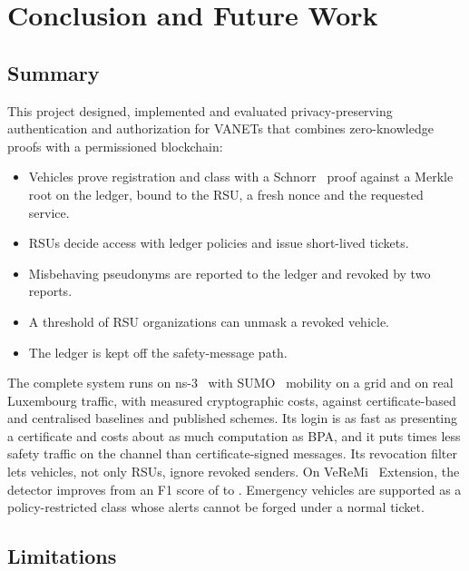 \chapter{Conclusion and Future Work}\label{ch:conclusion}

\section{Summary}

This project designed, implemented and evaluated privacy-preserving authentication and authorization
for VANETs that combines zero-knowledge proofs with a permissioned blockchain:
\begin{itemize}
  \item Vehicles prove registration and class with a Schnorr~\cite{schnorr1991} proof against a Merkle~\cite{merkle1987} root on the
  ledger, bound to the RSU, a fresh nonce and the requested service.
  \item RSUs decide access with ledger policies and issue short-lived tickets.
  \item Misbehaving pseudonyms are reported to the ledger and revoked by two reports.
  \item A threshold of RSU organizations can unmask a revoked vehicle.
  \item The ledger is kept off the safety-message path.
\end{itemize}
The complete system runs on ns-3~\cite{riley2010ns3} with SUMO~\cite{lopez2018sumo} mobility on a grid and on real Luxembourg traffic, with
measured cryptographic costs, against certificate-based and centralised baselines and published
schemes. Its login is as fast as presenting a certificate and costs about as much computation as
BPA, and it puts  times less safety traffic on the channel than
certificate-signed messages. Its revocation filter lets vehicles, not only RSUs, ignore
revoked senders. On VeReMi~\cite{kamel2020veremiext} Extension, the detector improves from an F1 score of 
to . Emergency vehicles are supported as a policy-restricted class whose
alerts cannot be forged under a normal ticket.

\section{Limitations}

